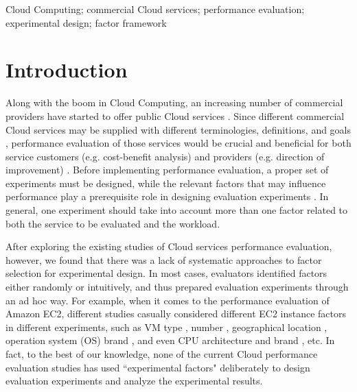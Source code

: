\documentclass[10pt, conference, compsocconf]{IEEEtran}
\begin{document}
\begin{IEEEkeywords}
Cloud Computing; commercial Cloud services; performance evaluation; experimental design; factor framework

\end{IEEEkeywords}


\IEEEpeerreviewmaketitle

\section{Introduction}
Along with the boom in Cloud Computing, an increasing number of commercial providers have started to offer public Cloud services \cite{Li_Yang_2010,Prodan_Ostermann_2009}. Since different commercial Cloud services may be supplied with different terminologies, definitions, and goals \cite{Prodan_Ostermann_2009}, performance evaluation of those services would be crucial and beneficial for both service customers (e.g. cost-benefit analysis) and providers (e.g. direction of improvement) \cite{Li_Yang_2010}. Before implementing performance evaluation, a proper set of experiments must be designed, while the relevant factors that may influence performance play a prerequisite role in designing evaluation experiments \cite{Jain_1991}. In general, one experiment should take into account more than one factor related to both the service to be evaluated and the workload. 

After exploring the existing studies of Cloud services performance evaluation, however, we found that there was a lack of systematic approaches to factor selection for experimental design. In most cases, evaluators identified factors either randomly or intuitively, and thus prepared evaluation experiments through an ad hoc way. For example, when it comes to the performance evaluation of Amazon EC2, different studies casually considered different EC2 instance factors in different experiments, such as VM type \cite{Stantchev_2009}, number \cite{Stantchev_2009}, geographical location \cite{Iosup_Yigitbasi_2010}, operation system (OS) brand \cite{Li_Yang_2010}, and even CPU architecture \cite{Iosup_Yigitbasi_2010} and brand \cite{Napper_Bientinesi_2009}, etc. In fact, to the best of our knowledge, none of the current Cloud performance evaluation studies has used ``experimental factors" deliberately to design evaluation experiments and analyze the experimental results.
\end{document}
